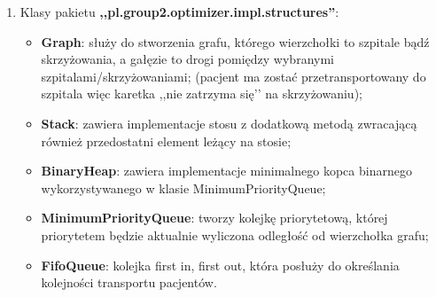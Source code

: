 \documentclass{article}
\begin{document}
{\begin{enumerate}
\begin{itemize}
        \item \textbf{Patients}: klasa posiadająca operacje, które można wykonywać na liście pacjentów (np. dodaj pacjenta, sprawdź czy leży poza obszarem);

        \item \textbf{Intersection}: klasa reprezentująca skrzyżowanie, jest ona potrzebna, aby algorytm poszukujący najkrótszej ścieżki mógł przecięcie dróg jako wierzchołek w drodze do szpitala;

        \item \textbf{Intersections}: klasa przechowująca operacje, które możemy wykonywać na większej ilości skrzyżowań;

        \item \textbf{Vertex}: interfejs, implementowany przez klasy Intersection oraz Hospital. Reprezentuje on wierzchołek grafu;

    \end{itemize}
    
    \clearpage
    
    \item Klasy pakietu \textbf{,,pl.group2.optimizer.impl.structures''}:
    \begin{itemize}
        \item \textbf{Graph}: służy do stworzenia grafu, którego wierzchołki to szpitale bądź skrzyżowania, a gałęzie to drogi pomiędzy wybranymi szpitalami/skrzyżowaniami;
(pacjent ma zostać przetransportowany do szpitala więc karetka ,,nie zatrzyma się’’ na skrzyżowaniu);

        \item  \textbf{Stack}: zawiera implementacje stosu z dodatkową metodą zwracającą również przedostatni element leżący na stosie;

        \item \textbf{BinaryHeap}: zawiera implementacje minimalnego kopca binarnego wykorzystywanego w klasie MinimumPriorityQueue;

        \item \textbf{MinimumPriorityQueue}: tworzy kolejkę priorytetową, której priorytetem będzie aktualnie wyliczona odległość od wierzchołka grafu;

        \item \textbf{FifoQueue}: kolejka first in, first out, która posłuży do określania kolejności transportu pacjentów.

    \end{itemize}
\end{enumerate}

}
\end{document}
